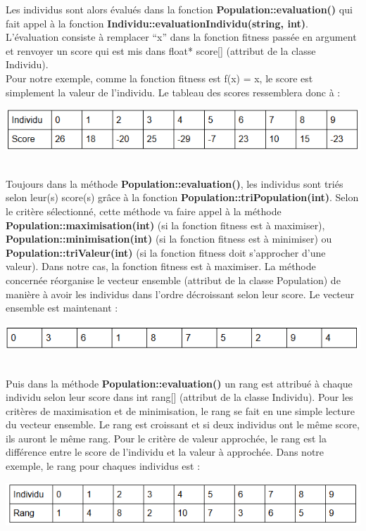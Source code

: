 \documentclass[a4paper,11pt]{article}
\begin{document}
			Les individus sont alors évalués dans la fonction \textbf{Population::evaluation()} qui fait appel à la fonction \textbf{Individu::evaluationIndividu(string, int)}.\\
			L’évaluation consiste à remplacer “x” dans la fonction fitness passée en argument et renvoyer un score qui est mis dans float* score[] (attribut de la classe Individu).\\
			Pour notre exemple, comme la fonction fitness est f(x) = x, le score est simplement la valeur de l’individu. Le tableau des scores ressemblera donc à : \\
			\centerline{\includegraphics[scale=0.5]{Evaluation.png}}\\
			
			Toujours dans la méthode \textbf{Population::evaluation()}, les individus sont triés selon leur(s) score(s) grâce à la fonction \textbf{Population::triPopulation(int)}.
			Selon le critère sélectionné, cette méthode va faire appel à la méthode \textbf{Population::maximisation(int)} (si la fonction fitness est à maximiser), \textbf{Population::minimisation(int)} (si la fonction fitness est à minimiser) ou \textbf{Population::triValeur(int)} (si la fonction fitness doit s’approcher d’une valeur).
			Dans notre cas, la fonction fitness est à maximiser. La méthode concernée réorganise le vecteur ensemble (attribut de la classe Population) de manière à avoir les individus dans l’ordre décroissant selon leur score.
			Le vecteur ensemble est maintenant :\\
			\centerline{\includegraphics[scale=0.5]{VecteurTrie.png}}\\
			
			Puis dans la méthode \textbf{Population::evaluation()} un rang est attribué à chaque individu selon leur score dans int rang[] (attribut de la classe Individu).
			Pour les critères de maximisation et de minimisation, le rang se fait en une simple lecture du vecteur ensemble.
			Le rang est croissant et si deux individus ont le même score, ils auront le même rang.
			Pour le critère de valeur approchée, le rang est la différence entre le score de l’individu et la valeur à approchée.
			Dans notre exemple, le rang pour chaques individus est :\\
			\centerline{\includegraphics[scale=0.5]{RangIndividu.png}}\\
			
\end{document}

